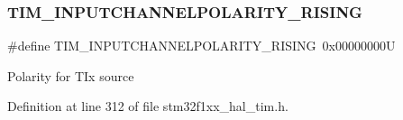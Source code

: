 \subsubsection{\texorpdfstring{T\+I\+M\+\_\+\+I\+N\+P\+U\+T\+C\+H\+A\+N\+N\+E\+L\+P\+O\+L\+A\+R\+I\+T\+Y\+\_\+\+R\+I\+S\+I\+NG}{TIM\_INPUTCHANNELPOLARITY\_RISING}}
{\footnotesize\ttfamily \#define T\+I\+M\+\_\+\+I\+N\+P\+U\+T\+C\+H\+A\+N\+N\+E\+L\+P\+O\+L\+A\+R\+I\+T\+Y\+\_\+\+R\+I\+S\+I\+NG~0x00000000U}

Polarity for T\+Ix source 

Definition at line 312 of file stm32f1xx\+\_\+hal\+\_\+tim.\+h.

